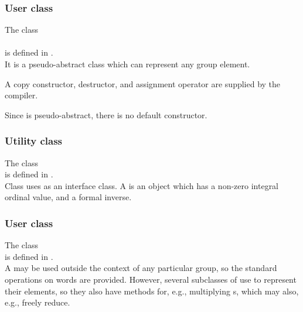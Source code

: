 \subsubsection{User class }


\noindent The class\\
\\
is defined in .\\
It is a pseudo-abstract class which can represent any group element.



\noindent A copy constructor, destructor, and assignment operator are
supplied by the compiler.

\noindent Since  is pseudo-abstract, there is no default
constructor.


\subsubsection{Utility class }


\noindent The class \\
is defined in .\\

Class  uses  as an interface class.
A  is an object which has a non-zero integral ordinal value,
and a formal inverse.




\subsubsection{User class }


\noindent The class \\
is defined in .\\

A  may be used outside the context of any particular group,
so the standard operations on words are provided.  However, several
subclasses of  use  to represent their elements, so
they also have methods for, e.g., multiplying s, which may
also, e.g., freely reduce.


